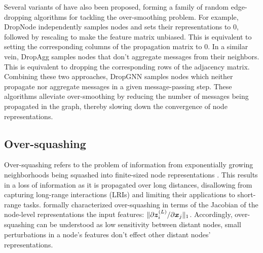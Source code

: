 Several variants of  have also been proposed, forming a family of random edge-dropping algorithms for tackling the over-smoothing problem. For example, DropNode \citep{feng2020dropnode} independently samples nodes and sets their representations to $0$, followed by rescaling to make the feature matrix unbiased. This is equivalent to setting the corresponding columns of the propagation matrix to $0$.
In a similar vein, DropAgg \citep{jiang2023dropagg} samples nodes that don't aggregate messages from their neighbors. This is equivalent to dropping the corresponding rows of the adjacency matrix.
Combining these two approaches, DropGNN \citep{papp2021dropgnn} samples nodes which neither propagate nor aggregate messages in a given message-passing step.
These algorithms alleviate over-smoothing by reducing the number of messages being propagated in the graph, thereby slowing down the convergence of node representations.

\subsection{Over-squashing}

Over-squashing refers to the problem of information from exponentially growing neighborhoods \cite{chen2018stochastic} being squashed into finite-sized node representations \cite{alon2021on}. This results in a loss of information as it is propagated over long distances, disallowing  from capturing long-range interactions (LRIs) and limiting their applications to short-range tasks. \citet{topping2022understanding} formally characterized over-squashing in terms of the Jacobian of the node-level representations \wrt the input features: $\|\partial \bm{z}^{\left(L\right)}_i / \partial \bm{x}_j\|_1$. Accordingly, over-squashing can be understood as low sensitivity between distant nodes, \ie small perturbations in a node's features don't effect other distant nodes' representations. 

